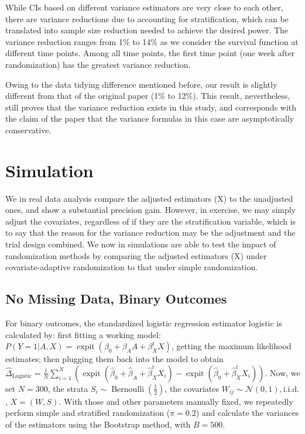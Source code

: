 \documentclass{article}
\begin{document}
While CIs based on different variance estimators are very close to each other, there are variance reductions due to accounting for stratification, which can be translated into sample size reduction needed to achieve the desired power. The variance reduction ranges from 1\% to 14\% as we consider the survival function at different time points. Among all time points, the first time point (one week after randomization) has the greatest variance reduction.

Owing to the data tidying difference mentioned before, our result is slightly different from that of the original paper (1\% to 12\%). This result, nevertheless, still proves that the variance reduction exists in this study, and corresponds with the claim of the paper that the variance formulas in this case are asymptotically conservative.





\section{Simulation}

We in real data analysis compare the adjusted estimators (X) to the unadjusted ones, and show a substantial precision gain. However, in exercise, we may simply adjust the covariates, regardless of if they are the stratification variable, which is to say that the reason for the variance reduction may be the adjustment and the trial design combined. We now in simulations are able to test the impact of randomization methods by comparing the adjusted estimators (X) under covariate-adaptive randomization to that under simple randomization.

\subsection{No Missing Data, Binary Outcomes}

For binary outcomes, the standardized logistic regression estimator logistic is calculated by: first fitting a working model: $P(Y = 1|A, X) = \operatorname{expit}(\beta_0 + \beta_AA + \beta^t_XX)$, getting the maximum likelihood estimates; then plugging them back into the model to obtain $\hat\Delta_{\text{Logistic}}=\frac1N\sum_{i=1}^N(\operatorname{expit}(\hat\beta_0 + \hat\beta_A + \hat\beta^t_XX_i)-\operatorname{expit}(\hat\beta_0 + \hat\beta^t_XX_i))$. Now, we set $N=300$, the strata $S_i\sim\operatorname{Bernoulli}(\frac12)$, the covariates $W_{ij}\sim\mathcal{N}(0,1), \text{i.i.d.}$, $X=(W,S)$. With those and other parameters manually fixed, we repeatedly perform simple and stratified randomization ($\pi = 0.2$) and calculate the variances of the estimators using the Bootstrap method\cite{bootstrap}, with $B=500$. %
 
\end{document}

